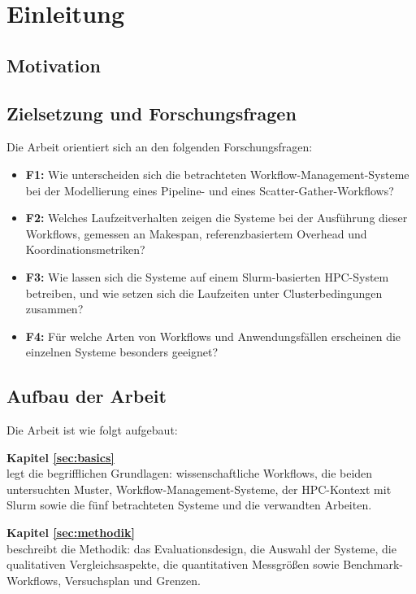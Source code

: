 \chapter{Einleitung}
\label{sec:intro}

\section{Motivation}
\label{sec:intro:motivation}

\section{Zielsetzung und Forschungsfragen}
\label{sec:intro:goal}

Die Arbeit orientiert sich an den folgenden Forschungsfragen:

\begin{itemize}
  \item \textbf{F1:} Wie unterscheiden sich die betrachteten
    Workflow-Management-Systeme bei der Modellierung eines Pipeline-
    und eines Scatter-Gather-Workflows?
  \item \textbf{F2:} Welches Laufzeitverhalten zeigen die Systeme bei
    der Ausführung dieser Workflows, gemessen an Makespan,
    referenzbasiertem Overhead und Koordinationsmetriken?
  \item \textbf{F3:} Wie lassen sich die Systeme auf einem
    Slurm-basierten HPC-System betreiben, und wie setzen sich die
    Laufzeiten unter Clusterbedingungen zusammen?
  \item \textbf{F4:} Für welche Arten von Workflows und
    Anwendungsfällen erscheinen die einzelnen Systeme besonders
    geeignet?
\end{itemize}

\section{Aufbau der Arbeit}
\label{sec:intro:structure}

Die Arbeit ist wie folgt aufgebaut:

\textbf{Kapitel \ref{sec:basics}} \\[0.2em]
legt die begrifflichen Grundlagen: wissenschaftliche Workflows, die
beiden untersuchten Muster, Workflow-Management-Systeme, der
HPC-Kontext mit Slurm sowie die fünf betrachteten Systeme und die
verwandten Arbeiten.

\textbf{Kapitel \ref{sec:methodik}} \\[0.2em]
beschreibt die Methodik: das Evaluationsdesign, die Auswahl der
Systeme, die qualitativen Vergleichsaspekte, die quantitativen
Messgrößen sowie Benchmark-Workflows, Versuchsplan und Grenzen.

